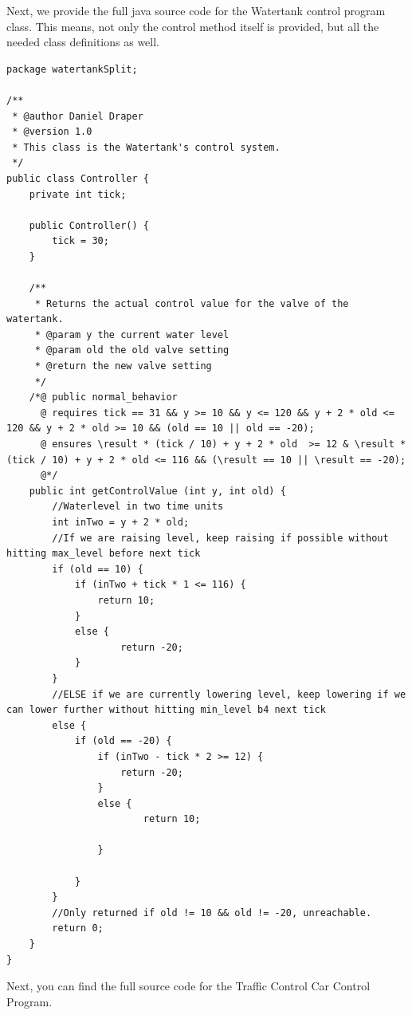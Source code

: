 Next, we provide the full java source code for the Watertank control program class. This means, not only the control method itself is provided, but all the needed class definitions as well.

\begin{lstlisting}[label=app:lst:watertankContr]
package watertankSplit;

/**
 * @author Daniel Draper
 * @version 1.0
 * This class is the Watertank's control system.
 */
public class Controller {
	private int tick;
	
	public Controller() {
		tick = 30;
	}
	
	/**
	 * Returns the actual control value for the valve of the watertank.
	 * @param y the current water level
	 * @param old the old valve setting
	 * @return the new valve setting
	 */
	/*@ public normal_behavior
	  @ requires tick == 31 && y >= 10 && y <= 120 && y + 2 * old <= 120 && y + 2 * old >= 10 && (old == 10 || old == -20);
	  @ ensures \result * (tick / 10) + y + 2 * old  >= 12 & \result * (tick / 10) + y + 2 * old <= 116 && (\result == 10 || \result == -20);
	  @*/
	public int getControlValue (int y, int old) {
		//Waterlevel in two time units
		int inTwo = y + 2 * old;
		//If we are raising level, keep raising if possible without hitting max_level before next tick
		if (old == 10) {
			if (inTwo + tick * 1 <= 116) {
				return 10;
			}
			else {
					return -20;
			}
		}
		//ELSE if we are currently lowering level, keep lowering if we can lower further without hitting min_level b4 next tick
		else {
			if (old == -20) {
				if (inTwo - tick * 2 >= 12) {
					return -20;
				}
				else {
						return 10;
				
				}
		
			}
		}
		//Only returned if old != 10 && old != -20, unreachable.
		return 0;
	}
}
\end{lstlisting}

Next, you can find the full source code for the Traffic Control Car Control Program. 

